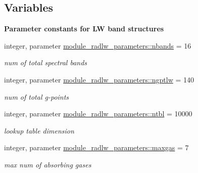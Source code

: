 \subsection*{Variables}
\begin{Indent}\textbf{ Parameter constants for LW band structures}\par
\begin{DoxyCompactItemize}
\item 
\mbox{\label{namespacemodule__radlw__parameters_a48e11b992a80595d71c92f7c9bfbe19c}} 
integer, parameter \hyperlink{namespacemodule__radlw__parameters_a48e11b992a80595d71c92f7c9bfbe19c}{module\+\_\+radlw\+\_\+parameters\+::nbands} = 16
\begin{DoxyCompactList}\small\item\em num of total spectral bands \end{DoxyCompactList}\item 
\mbox{\label{namespacemodule__radlw__parameters_a05fe17fe932ce62a3ae2c6c564584321}} 
integer, parameter \hyperlink{namespacemodule__radlw__parameters_a05fe17fe932ce62a3ae2c6c564584321}{module\+\_\+radlw\+\_\+parameters\+::ngptlw} = 140
\begin{DoxyCompactList}\small\item\em num of total g-\/points \end{DoxyCompactList}\item 
\mbox{\label{namespacemodule__radlw__parameters_a61ae33b9db5bac9962f72e2a0db3c0e4}} 
integer, parameter \hyperlink{namespacemodule__radlw__parameters_a61ae33b9db5bac9962f72e2a0db3c0e4}{module\+\_\+radlw\+\_\+parameters\+::ntbl} = 10000
\begin{DoxyCompactList}\small\item\em lookup table dimension \end{DoxyCompactList}\item 
\mbox{\label{namespacemodule__radlw__parameters_a01330b4ad09907f2db51cb516ed21033}} 
integer, parameter \hyperlink{namespacemodule__radlw__parameters_a01330b4ad09907f2db51cb516ed21033}{module\+\_\+radlw\+\_\+parameters\+::maxgas} = 7
\begin{DoxyCompactList}\small\item\em max num of absorbing gases \end{DoxyCompactList}\item 

\end{DoxyCompactItemize}
\end{Indent}
